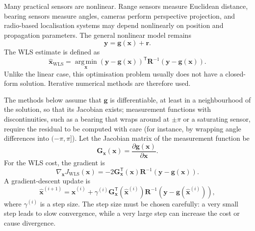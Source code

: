\documentclass[graybox,envcountchap]{style/SNmono}
\begin{document}
Many practical sensors are nonlinear. Range sensors measure Euclidean distance, bearing sensors measure angles, cameras perform perspective projection, and radio-based localisation systems may depend nonlinearly on position and propagation parameters. The general nonlinear model remains
\begin{equation}
\mathbf{y} = \mathbf{g}(\mathbf{x}) + \mathbf{r}.
\end{equation}
The WLS estimate is defined as
\begin{equation}
\widehat{\mathbf{x}}_{\mathrm{WLS}} = \operatorname*{arg\,min}_{\mathbf{x}} \left( \mathbf{y} - \mathbf{g}(\mathbf{x}) \right)^{\mathsf T} \mathbf{R}^{-1} \left( \mathbf{y} - \mathbf{g}(\mathbf{x}) \right).
\end{equation}
Unlike the linear case, this optimisation problem usually does not have a closed-form solution. Iterative numerical methods are therefore used.

The methods below assume that $\mathbf{g}$ is differentiable, at least in a neighbourhood of the solution, so that its Jacobian exists; measurement functions with discontinuities, such as a bearing that wraps around at $\pm\pi$ or a saturating sensor, require the residual to be computed with care (for instance, by wrapping angle differences into $(-\pi,\pi]$). Let the Jacobian matrix of the measurement function be
\begin{equation}
\mathbf{G}_{\mathbf{x}}(\mathbf{x}) = \frac{\partial \mathbf{g}(\mathbf{x})}{\partial \mathbf{x}}.
\end{equation}
For the WLS cost, the gradient is
\begin{equation}
\nabla_{\mathbf{x}} J_{\mathrm{WLS}}(\mathbf{x}) = -2 \mathbf{G}_{\mathbf{x}}^{\mathsf T}(\mathbf{x}) \mathbf{R}^{-1} \left(\mathbf{y} - \mathbf{g}(\mathbf{x})\right).
\end{equation}
A gradient-descent update is
\begin{equation}
\widehat{\mathbf{x}}^{(i+1)} = \widehat{\mathbf{x}}^{(i)}+\gamma^{(i)} \mathbf{G}_{\mathbf{x}}^{\mathsf T} \left(\widehat{\mathbf{x}}^{(i)}\right)\mathbf{R}^{-1}\left(\mathbf{y}-\mathbf{g} \left( \widehat{\mathbf{x}}^{(i)} \right)\right),
\end{equation}
where $\gamma^{(i)}$ is a step size. The step size must be chosen carefully: a very small step leads to slow convergence, while a very large step can increase the cost or cause divergence.
\end{document}
